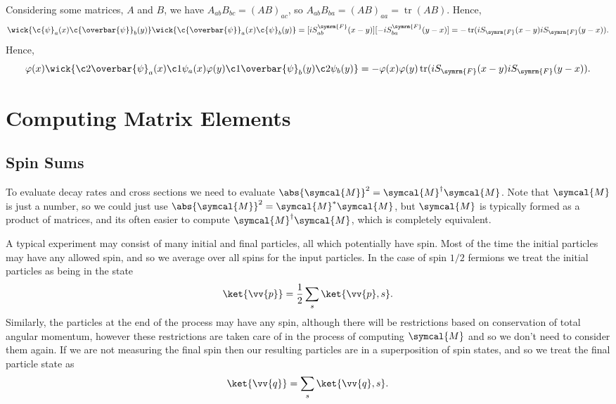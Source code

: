 \documentclass[fleqn]{NotesClass}
\newcommand{\hermit}{{\dagger}}
\newcommand{\feynman}{\symrm{F}}
\newcommand{\amplitude}{\symcal{M}}
\DeclareMathOperator{\tr}{tr}
\newcommand{\diracadjoint}[1]{\overbar{#1}}
\begin{document}
    Considering some matrices, \(A\) and \(B\), we have \(A_{ab}B_{bc} = (AB)_{ac}\), so \(A_{ab}B_{ba} = (AB)_{aa} = \tr(AB)\).
    Hence,
    \begin{equation}
        \wick{\c{\psi}_a(x) \c{\diracadjoint{\psi}}_b(y)} \wick{\c{\diracadjoint{\psi}}_a(x) \c{\psi}_b(y)} = [iS_{ab}^{\feynman}(x - y)][-iS^{\feynman}_{ba}(y - x)] = -\tr(iS_{\feynman}(x - y)  iS_{\feynman}(y - x)).
    \end{equation}
    Hence,
    \begin{equation}
        \varphi(x) \wick{ \c2{\diracadjoint{\psi}}_a(x) \c1{\psi}_a(x) \varphi(y) \c1{\diracadjoint{\psi}}_b(y) \c2{\psi}_b(y)} = -\varphi(x)\varphi(y) \tr(iS_{\feynman}(x - y)  iS_{\feynman}(y - x)).
    \end{equation}
    
    \chapter{Computing Matrix Elements}
    \section{Spin Sums}
    To evaluate decay rates and cross sections we need to evaluate \(\abs{\amplitude}^2 = \amplitude^\hermit \amplitude\).
    Note that \(\amplitude\) is just a number, so we could just use \(\abs{\amplitude}^2 = \amplitude^*\amplitude\), but \(\amplitude\) is typically formed as a product of matrices, and its often easier to compute \(\amplitude^\hermit \amplitude\), which is completely equivalent.
    
    A typical experiment may consist of many initial and final particles, all which potentially have spin.
    Most of the time the initial particles may have any allowed spin, and so we average over all spins for the input particles.
    In the case of spin \(1/2\) fermions we treat the initial particles as being in the state
    \begin{equation}
        \ket{\vv{p}} = \frac{1}{2} \sum_s \ket{\vv{p}, s}.
    \end{equation}
    Similarly, the particles at the end of the process may have any spin, although there will be restrictions based on conservation of total angular momentum, however these restrictions are taken care of in the process of computing \(\amplitude\) and so we don't need to consider them again.
    If we are not measuring the final spin then our resulting particles are in a superposition of spin states, and so we treat the final particle state as
    \begin{equation}
        \ket{\vv{q}} = \sum_s \ket{\vv{q}, s}.
    \end{equation}
    
\end{document}
